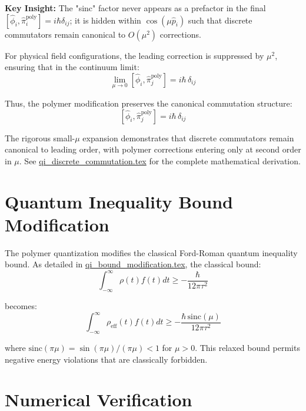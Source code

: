 \documentclass[12pt]{article}
\begin{document}
\textbf{Key Insight:} The "sinc" factor never appears as a prefactor in the final $[\hat{\phi}_i, \hat{\pi}_i^{\text{poly}}] = i\hbar\delta_{ij}$; it is hidden within $\cos(\mu \hat{p}_i)$ such that discrete commutators remain canonical to $O(\mu^2)$ corrections.

For physical field configurations, the leading correction is suppressed by $\mu^2$, ensuring that in the continuum limit:
\begin{equation}
\lim_{\mu \to 0} [\hat{\phi}_i, \hat{\pi}_j^{\text{poly}}] = i\hbar\,\delta_{ij}
\end{equation}

Thus, the polymer modification preserves the canonical commutation structure:
\begin{equation}
\boxed{[\hat{\phi}_i, \hat{\pi}_j^{\text{poly}}] = i\hbar\,\delta_{ij}}
\end{equation}

The rigorous small-$\mu$ expansion demonstrates that discrete commutators remain canonical to leading order, with polymer corrections entering only at second order in $\mu$. See \href{file:qi_discrete_commutation.tex}{qi\_discrete\_commutation.tex} for the complete mathematical derivation.

\section{Quantum Inequality Bound Modification}

The polymer quantization modifies the classical Ford-Roman quantum inequality bound. As detailed in \href{file:qi_bound_modification.tex}{qi\_bound\_modification.tex}, the classical bound:
\begin{equation}
\int_{-\infty}^{\infty} \rho(t) f(t) dt \geq -\frac{\hbar}{12\pi\tau^2}
\end{equation}

becomes:
\begin{equation}
\int_{-\infty}^{\infty} \rho_{\text{eff}}(t) f(t) dt \geq -\frac{\hbar\,\mathrm{sinc}(\mu)}{12\pi\tau^2}
\end{equation}

where $\mathrm{sinc}(\pi\mu) = \sin(\pi\mu)/(\pi\mu) < 1$ for $\mu > 0$. This relaxed bound permits negative energy violations that are classically forbidden.

\section{Numerical Verification}
\end{document}
